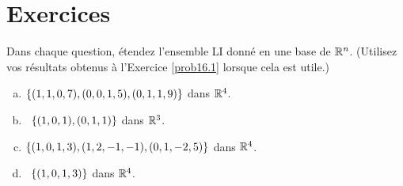 \section*{Exercices}


\begin{prob} \label{prob17.1} Dans chaque question, étendez l'ensemble LI donné en une base de $\mathbb{R}^n$.  (Utilisez vos résultats obtenus à l'Exercice \ref{prob16.1} lorsque cela est utile.)
\medskip
\begin{enumerate}[a)]
\item $\{(1, 1, 0, 7),(0, 0, 1, 5),(0,1,1,9)\}$ dans $\mathbb{R}^4$.
\medskip
  
\item\sov~$\{(1, 0,1), (0,1,1)\}$ dans $\mathbb{R}^3$.
\medskip
 
\item $\{(1, 0, 1, 3), (1, 2, -1, -1), (0, 1, -2, 5)\}$ dans $\mathbb{R}^4$.
\medskip
 
\item\sov~$\{(1, 0, 1, 3)\}$ dans $\mathbb{R}^4$.
\medskip
 
\end{enumerate}
\end{prob} 